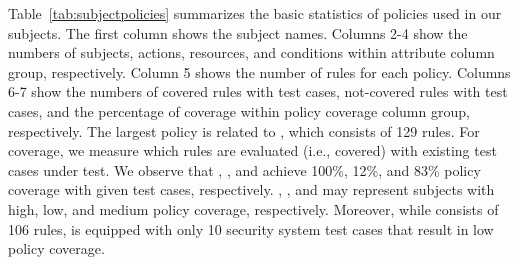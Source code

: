 Table~\ref{tab:subjectpolicies} summarizes the basic statistics of policies used in our subjects.
The first column shows the subject names.
Columns 2-4 show the numbers of subjects, actions, resources, and conditions within attribute column group, respectively.
Column 5 shows the number of rules for each policy.
Columns 6-7 show the numbers of covered rules with test cases, not-covered rules with test cases, and the percentage
of coverage within policy coverage column group, respectively.
The largest policy is related to , which consists of 129 rules.
For coverage, we measure which rules are
evaluated (i.e., covered) with existing test cases under test.
We observe that , , and 
achieve 100\%, 12\%, and 83\% policy coverage with given test cases, respectively. 
, , and  may represent subjects
with high, low, and medium policy coverage, respectively.
Moreover, while  consists of 106 rules,  is equipped with only 10 security system test cases
that result in low policy coverage.









